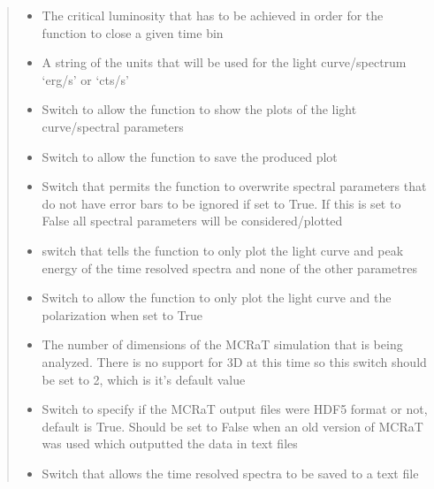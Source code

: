 \documentclass[letterpaper,10pt,english]{sphinxmanual}
\begin{document}
\begin{fulllineitems}
\begin{quote}
\begin{description}
\begin{itemize}
\item {} 
 \textendash{} The critical luminosity that has to be achieved in order for the function to close a given time bin

\item {} 
 \textendash{} A string of the units that will be used for the light curve/spectrum ‘erg/s’ or ‘cts/s’

\item {} 
 \textendash{} Switch to allow the function to show the plots of the light curve/spectral parameters

\item {} 
 \textendash{} Switch to allow the function to save the produced plot

\item {} 
 \textendash{} Switch that permits the function to overwrite spectral parameters that do not have error bars
to be ignored if set to True. If this is set to False all spectral parameters will be considered/plotted

\item {} 
 \textendash{} switch that tells the function to only plot the light curve and peak energy of the time resolved
spectra and none of the other parametres

\item {} 
 \textendash{} Switch to allow the function to only plot the light curve and the polarization when set to True

\item {} 
 \textendash{} The number of dimensions of the MCRaT simulation that is being analyzed. There is no support for 3D at
this time so this switch should be set to 2, which is it’s default value

\item {} 
 \textendash{} Switch to specify if the MCRaT output files were HDF5 format or not, default is True. Should be set to
False when an old version of MCRaT was used which outputted the data in text files

\item {} 
 \textendash{} Switch that allows the time resolved spectra to be saved to a text file


\end{itemize}
\end{description}
\end{quote}
\end{fulllineitems}
\end{document}
